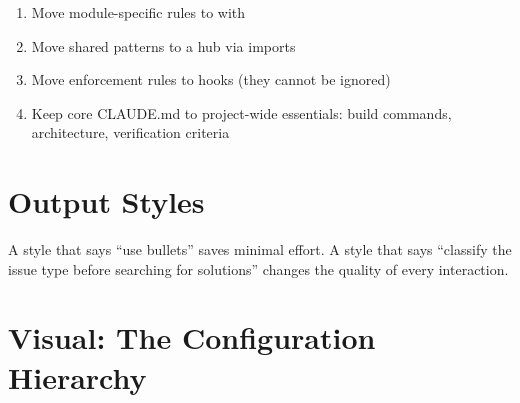 
\begin{enumerate}
  \item Move module-specific rules to  with 
  \item Move shared patterns to a hub via  imports
  \item Move enforcement rules to hooks (they cannot be ignored)
  \item Keep core CLAUDE.md to project-wide essentials: build commands,
    architecture, verification criteria
\end{enumerate}

\section{Output Styles}
\label{sec:output-styles}



A style that says ``use bullets'' saves minimal effort.
A style that says ``classify the issue type before searching for solutions''
changes the quality of every interaction.

\section{Visual: The Configuration Hierarchy}

